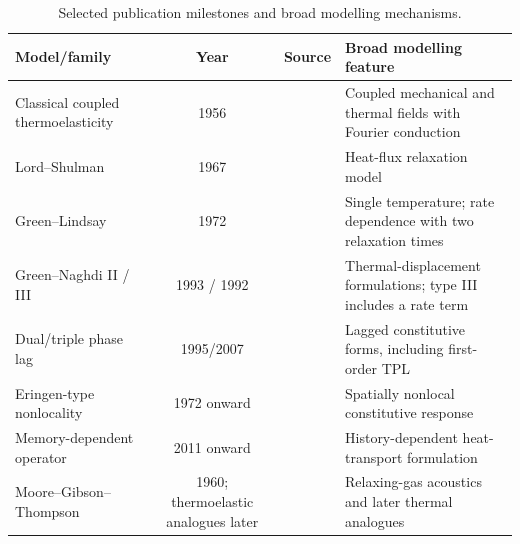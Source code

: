 \begin{table}[htbp]
\centering
\small
\caption{Selected publication milestones and broad modelling mechanisms.}
\label{tab:T1-historical}
\begin{tabularx}{\textwidth}{@{}p{3.0cm}c p{2.4cm}X@{}}
\toprule
\textbf{Model/family} & \textbf{Year} & \textbf{Source} & \textbf{Broad modelling feature} \\
\midrule
Classical coupled thermoelasticity & 1956 & \cite{Biot1956} & Coupled mechanical and thermal fields with Fourier conduction \\
Lord--Shulman & 1967 & \cite{Lord1967} & Heat-flux relaxation model \\
Green--Lindsay & 1972 & \cite{Green1972} & Single temperature; rate dependence with two relaxation times \\
Green--Naghdi II / III & 1993 / 1992 & \cite{Green1993,GreenGN1992} & Thermal-displacement formulations; type III includes a rate term \\
Dual/triple phase lag & 1995/2007 & \cite{Tzou1995,RoyChoudhuri2007} & Lagged constitutive forms, including first-order TPL \\
Eringen-type nonlocality & 1972 onward & \cite{Eringen1972,Eringen1974,Eringen1983} & Spatially nonlocal constitutive response \\
Memory-dependent operator & 2011 onward & \cite{Wang2011} & History-dependent heat-transport formulation \\
Moore--Gibson--Thompson & 1960; thermoelastic analogues later & \cite{MooreGibson1960,Quintanilla2019} & Relaxing-gas acoustics and later thermal analogues \\
\bottomrule
\end{tabularx}
\par{}
\end{table}
